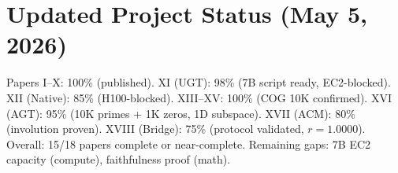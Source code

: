 \documentclass[11pt]{article}
\begin{document}
\section*{Updated Project Status (May 5, 2026)}

Papers I--X: 100\% (published). XI (UGT): 98\% (7B script ready, EC2-blocked). XII (Native): 85\% (H100-blocked). XIII--XV: 100\% (COG 10K confirmed). XVI (AGT): 95\% (10K primes + 1K zeros, 1D subspace). XVII (ACM): 80\% (involution proven). XVIII (Bridge): 75\% (protocol validated, $r=1.0000$). Overall: 15/18 papers complete or near-complete. Remaining gaps: 7B EC2 capacity (compute), faithfulness proof (math).
\end{document}
